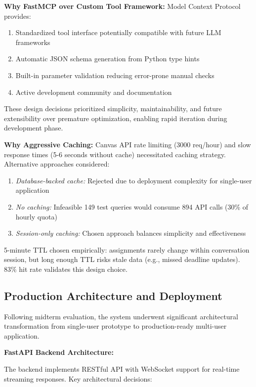 \documentclass{article}
\begin{document}
\textbf{Why FastMCP over Custom Tool Framework:} Model Context Protocol provides:

\begin{enumerate}
    \item Standardized tool interface potentially compatible with future LLM frameworks
    \item Automatic JSON schema generation from Python type hints
    \item Built-in parameter validation reducing error-prone manual checks
    \item Active development community and documentation
\end{enumerate}

These design decisions prioritized simplicity, maintainability, and future extensibility over premature optimization, enabling rapid iteration during development phase.

\textbf{Why Aggressive Caching:} Canvas API rate limiting (3000 req/hour) and slow response times (5-6 seconds without cache) necessitated caching strategy. Alternative approaches considered:

\begin{enumerate}
    \item \textit{Database-backed cache:} Rejected due to deployment complexity for single-user application
    \item \textit{No caching:} Infeasible 149 test queries would consume 894 API calls (30\% of hourly quota)
    \item \textit{Session-only caching:} Chosen approach balances simplicity and effectiveness
\end{enumerate}

5-minute TTL chosen empirically: assignments rarely change within conversation session, but long enough TTL risks stale data (e.g., missed deadline updates). 83\% hit rate validates this design choice.

\subsection{Production Architecture and Deployment}

Following midterm evaluation, the system underwent significant architectural transformation from single-user prototype to production-ready multi-user application.

\textbf{FastAPI Backend Architecture:}

The backend implements RESTful API with WebSocket support for real-time streaming responses. Key architectural decisions:
\end{document}
